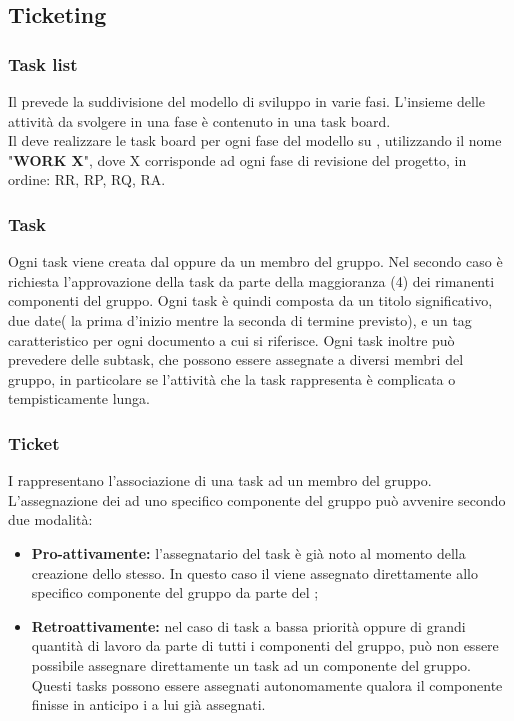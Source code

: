 \documentclass[NormeDiProgetto.tex]{subfiles}
\begin{document}
	
	\subsection{Ticketing}
	\subsubsection{Task list}
	Il \pdp prevede la suddivisione del modello di sviluppo in varie fasi.
	L'insieme delle attività da svolgere in una fase è contenuto in una task board.\\
	Il \respdiprog deve realizzare le task board per ogni fase del modello su , utilizzando il nome "\textbf{WORK X}", dove X corrisponde ad ogni fase di revisione del progetto, in ordine: RR, RP, RQ, RA.
	
	\subsubsection{Task}
	Ogni task viene creata dal \respdiprog oppure da un membro del gruppo. Nel secondo caso è richiesta l'approvazione della task da parte della maggioranza (4) dei rimanenti componenti del gruppo.
	Ogni task è quindi composta da un titolo significativo, due date( la prima d'inizio mentre la seconda di termine previsto), e un tag caratteristico per ogni documento a cui si riferisce. Ogni task inoltre può prevedere delle subtask, che possono essere assegnate a diversi membri del gruppo, in particolare se l'attività che la task rappresenta è complicata o tempisticamente lunga.
	
	\subsubsection{Ticket}
	I  rappresentano l'associazione di una task ad un membro del gruppo.
	L'assegnazione dei  ad uno specifico componente del gruppo può avvenire secondo due modalità:
	\begin{itemize}
		\item \textbf{Pro-attivamente:} l'assegnatario del task è già noto al momento della creazione dello stesso. In questo caso il  viene assegnato direttamente allo specifico componente del gruppo da parte del \respdiprog; 
		\item \textbf{Retroattivamente:} nel caso di task a bassa priorità oppure di grandi quantità di lavoro da parte di tutti i componenti del gruppo, può non essere possibile assegnare direttamente un task ad un componente del gruppo. Questi tasks possono essere assegnati autonomamente qualora il componente finisse in anticipo i  a lui già assegnati.
	\end{itemize}
	
\end{document}
